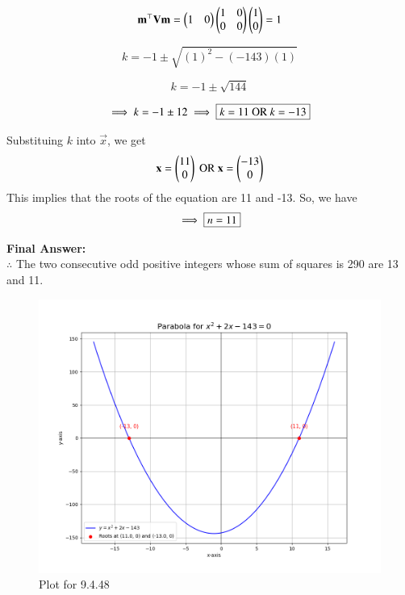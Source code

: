 \documentclass[journal,12pt,onecolumn]{IEEEtran}
\theoremstyle{remark}
\begin{document}
\begin{equation}
    \mathbf{m}^{\top}\mathbf{V}\mathbf{m} = \begin{pmatrix}1&0\end{pmatrix}\begin{pmatrix}1&0\\0&0\end{pmatrix}\begin{pmatrix}1\\0\end{pmatrix} = 1
\end{equation}

\begin{equation}
    k = -1 \pm \sqrt{(1)^2 - (-143)(1)}
\end{equation}

\begin{equation}
    k = -1 \pm \sqrt{144}
\end{equation}

\begin{equation}
    \implies k = -1 \pm 12 \implies \fbox{$k = 11 \text{ OR } k = -13$}
\end{equation}

Substituing $k$ into $\vec{x}$, we get
\begin{equation}
    \mathbf{x} = \begin{pmatrix}11\\0\end{pmatrix} \text{ OR } \mathbf{x} = \begin{pmatrix}-13\\0\end{pmatrix}
\end{equation}
This implies that the roots of the equation are 11 and -13.
So, we have
\begin{equation}
    \implies \fbox{$n = 11$}
\end{equation}

\textbf{Final Answer: }\\
$\therefore$ The two consecutive odd positive integers whose sum of squares is 290 are 13 and 11.

\begin{figure}[H]
    \centering
    \includegraphics[width=0.80\columnwidth]{figs/1.png}
    \caption{Plot for 9.4.48}
\end{figure}
\end{document}
